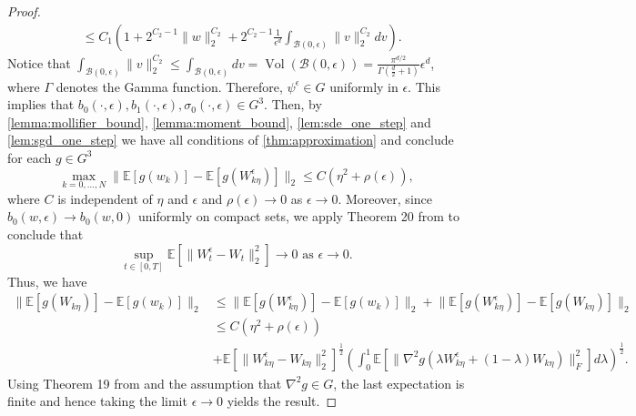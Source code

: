 \documentclass[12pt]{article}
\theoremstyle{definition}
\numberwithin{equation}{section}
\newcommand{\CB}{\mathcal{B}}
\newcommand{\ev}[1]{\mathbb{E}\left[{#1}\right]}
\newcommand{\norm}[1]{\lVert{#1}\rVert_2}
\newcommand{\normf}[1]{\lVert{#1}\rVert_F}
\DeclareMathOperator{\vol}{Vol}
\begin{document}
\begin{proof}
\begin{align*}
    &\leq C_1\left(1 + 2^{C_2 - 1} \norm{w}^{C_2} + 2^{C_2 - 1}\frac{1}{\epsilon^d}\int_{\CB(0,\epsilon)}\norm{v}^{C_2}dv\right).
  \end{align*}
  Notice that $\int_{\CB(0,\epsilon)}\norm{v}^{C_2} \leq \int_{\CB(0,\epsilon)}dv = \vol(\CB(0,\epsilon)) = \frac{\pi^{d/2}}{\Gamma(\frac{d}{2}+1)}\epsilon^d$, where $\Gamma$ denotes the Gamma function. Therefore, $\psi^{\epsilon} \in G$ uniformly in $\epsilon$.
  This implies that $b_0(\cdot,\epsilon), b_1(\cdot,\epsilon), \sigma_0(\cdot, \epsilon) \in G^3$.
  Then, by \autoref{lemma:mollifier_bound}, \autoref{lemma:moment_bound}, \autoref{lem:sde_one_step} and \autoref{lem:sgd_one_step} we have all conditions of \autoref{thm:approximation} and conclude for each $g \in G^3$
  \begin{equation*}
    \max_{k=0,\dots,N}\norm{\ev{g(w_k)} - \ev{g(W^{\epsilon}_{k\eta})}} \leq C(\eta^2 + \rho(\epsilon)),
  \end{equation*}
  where $C$ is independent of $\eta$ and $\epsilon$ and $\rho(\epsilon) \rightarrow 0$ as $\epsilon \rightarrow 0$. Moreover, since $b_0(w, \epsilon) \rightarrow b_0(w, 0)$ uniformly on compact sets, we apply Theorem 20 from \cite{liStochasticModifiedEquations2019} to conclude that
  \begin{equation*}
    \sup_{t \in [0,T]}\ev{\norm{W^{\epsilon}_t - W_t}^2} \rightarrow 0 \text{ as } \epsilon \rightarrow 0.
  \end{equation*}
  Thus, we have
  \begin{align*}
    \norm{\ev{g(W_{k\eta})} - \ev{g(w_k)}} &\leq  \norm{\ev{g(W_{k\eta}^\epsilon)} - \ev{g(w_k)}} + \norm{\ev{g(W_{k\eta}^{\epsilon})} - \ev{g(W_{k\eta})}} \\
    &\leq C(\eta^2 + \rho(\epsilon)) \\
    &+ \ev{\norm{W^{\epsilon}_{k\eta} - W_{k\eta}}^2}^{\frac{1}{2}} \left( \int_0^1 \ev{\normf{\nabla^2g(\lambda W^{\epsilon}_{k\eta} + (1-\lambda)W_{k\eta})}^2}d\lambda\right)^{\frac{1}{2}}.
  \end{align*}
  Using Theorem 19 from \cite{liStochasticModifiedEquations2019} and the assumption that $\nabla^2g \in G$, the last expectation is finite and hence taking the limit $\epsilon \rightarrow 0$ yields the result.
\end{proof}
\end{document}

